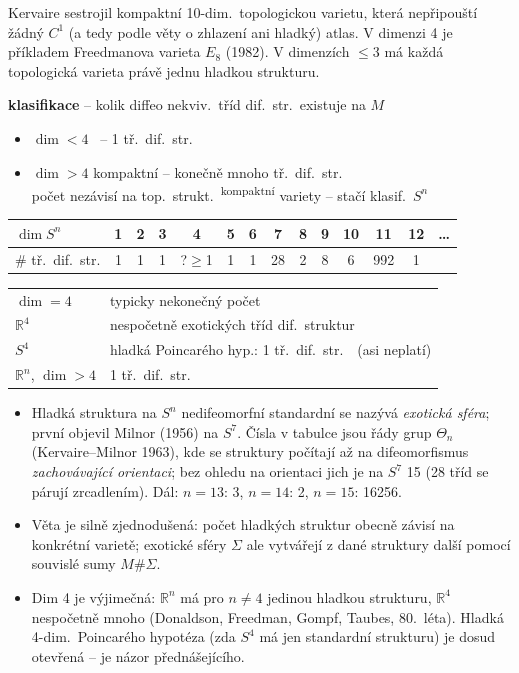 \begin{vysvetleni}
Kervaire sestrojil kompaktní 10-dim.\ topologickou varietu, která nepřipouští žádný $C^1$ (a tedy podle věty o zhlazení ani hladký) atlas. V dimenzi 4 je příkladem Freedmanova varieta $E_8$ (1982). V dimenzích $\leq3$ má každá topologická varieta právě jednu hladkou strukturu.
\end{vysvetleni}

\textbf{klasifikace} -- kolik diffeo nekviv.\ tříd dif.\ str.\ existuje na $M$
\begin{itemize}[nosep]
  \item[] $\dim < 4$ \ -- 1 tř.\ dif.\ str.
  \item[] $\dim > 4$ kompaktní -- konečně mnoho tř.\ dif.\ str. \\
          \quad počet nezávisí na top.\ strukt.\ \textsuperscript{kompaktní} variety -- stačí klasif.\ $S^n$
\end{itemize}
\begin{center}
\begin{tabular}{l|cccccccccccc|c}
$\dim S^n$ & 1 & 2 & 3 & 4 & 5 & 6 & 7 & 8 & 9 & 10 & 11 & 12 & \dots \\ \hline
\# tř.\ dif.\ str. & 1 & 1 & 1 & ?$\geq$1 & 1 & 1 & 28 & 2 & 8 & 6 & 992 & 1 &
\end{tabular}
\end{center}
\begin{tabular}{@{}ll}
$\dim = 4$ & typicky nekonečný počet \\
\quad $\mathbb{R}^4$ & nespočetně exotických tříd dif.\ struktur \\
\quad $S^4$ & hladká Poincarého hyp.: 1 tř.\ dif.\ str.\ \ (asi neplatí) \\
$\mathbb{R}^n$, $\dim > 4$ & 1 tř.\ dif.\ str.
\end{tabular}

\begin{vysvetleni}
\begin{itemize}[nosep]
  \item Hladká struktura na $S^n$ nedifeomorfní standardní se nazývá \emph{exotická sféra}; první objevil Milnor (1956) na $S^7$. Čísla v tabulce jsou řády grup $\Theta_n$ (Kervaire--Milnor 1963), kde se struktury počítají až na difeomorfismus \emph{zachovávající orientaci}; bez ohledu na orientaci jich je na $S^7$ 15 (28 tříd se párují zrcadlením). Dál: $n=13$: 3, $n=14$: 2, $n=15$: 16256.
  \item Věta  je silně zjednodušená: počet hladkých struktur obecně závisí na konkrétní varietě; exotické sféry $\Sigma$ ale vytvářejí z dané struktury další pomocí souvislé sumy $M\#\Sigma$.
  \item Dim 4 je výjimečná: $\mathbb{R}^n$ má pro $n\neq4$ jedinou hladkou strukturu, $\mathbb{R}^4$ nespočetně mnoho (Donaldson, Freedman, Gompf, Taubes, 80.~léta). Hladká 4-dim.\ Poincarého hypotéza (zda $S^4$ má jen standardní strukturu) je dosud otevřená --  je názor přednášejícího.
\end{itemize}
\end{vysvetleni}

